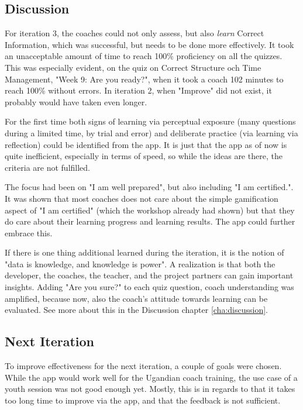 \subsection{Discussion}

  For iteration 3, the coaches could not only assess, but also \textit{learn} Correct Information, which was successful, but needs to be done more effectively. It took an unacceptable amount of time to reach 100\% proficiency on all the quizzes. This was especially evident, on the quiz on Correct Structure och Time Management, "Week 9: Are you ready?", when it took a coach 102 minutes to reach 100\% without errors. In iteration 2, when "Improve" did not exist, it probably would have taken even longer.

  For the first time both signs of learning via perceptual exposure (many questions during a limited time, by trial and error) and deliberate practice (via learning via reflection) could be identified from the app. It is just that the app as of now is quite inefficient, especially in terms of speed, so while the ideas are there, the criteria are not fulfilled.

  The focus had been on "I am well prepared", but also including "I am certified.". It was shown that most coaches does not care about the simple gamification aspect of "I am certified" (which the workshop already had shown) but that they do care about their learning progress and learning results. The app could further embrace this.

  If there is one thing additional learned during the iteration, it is the notion of "data is knowledge, and knowledge is power". A realization is that both the developer, the coaches, the teacher, and the project partners can gain important insights. Adding "Are you sure?" to each quiz question, coach understanding was amplified, because now, also the coach's attitude towards learning can be evaluated. See more about this in the Discussion chapter \ref{cha:discussion}.

  \subsection{Next Iteration}
  To improve effectiveness for the next iteration, a couple of goals were chosen. While the app would work well for the Ugandian coach training, the use case of a youth session was not good enough yet. Mostly, this is in regards to that it takes too long time to improve via the app, and that the feedback is not sufficient.

